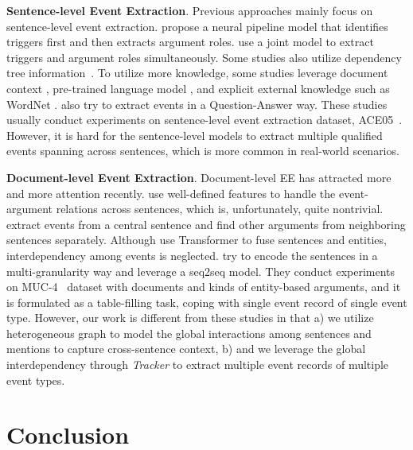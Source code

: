 \documentclass[11pt,a4paper]{article}
\begin{document}
\textbf{Sentence-level Event Extraction}. 
Previous approaches mainly focus on sentence-level event extraction.
\citet{chen-etal-2015-event} propose a neural pipeline model that identifies triggers first and then extracts argument roles.
\citet{nguyen-etal-2016-joint} use a joint model to extract triggers and argument roles simultaneously.
Some studies also utilize dependency tree information~\citep{liu-etal-2018-jointly, yan-etal-2019-event}.
To utilize more knowledge, some studies leverage 
document context \citep{chen-etal-2018-collective, zhao-etal-2018-document}, pre-trained language model \citep{yang-etal-2019-exploring-pre}, and explicit external knowledge \citep{DBLP:conf/aaai/Liu0019, tong-etal-2020-improving} such as WordNet \citep{DBLP:journals/cacm/Miller95}.
\citet{du-cardie-2020-event} also try to extract events in a Question-Answer way.
These studies usually conduct experiments on sentence-level event extraction dataset,  ACE05~\citep{ace05}.
However, it is hard for the sentence-level models to extract multiple qualified events spanning across sentences, which is more common in real-world scenarios.

\textbf{Document-level Event Extraction}.
Document-level EE has attracted more and more attention recently.
\citet{yang-mitchell-2016-joint} use well-defined features to handle the event-argument relations across sentences, which is, unfortunately, quite nontrivial.
\citet{yang-etal-2018-dcfee} extract events from a central sentence and find other arguments from neighboring sentences separately.
Although \citet{zheng-etal-2019-doc2edag} use Transformer to fuse sentences and entities, interdependency among events is neglected.
\citet{du-cardie-2020-document} try to encode the sentences in a multi-granularity way and \citet{DBLP:journals/corr/abs-2008-09249} leverage a seq2seq model.
They conduct experiments on MUC-4~\citep{muc} dataset with  documents and  kinds of entity-based arguments, and it is formulated as a table-filling task, coping with single event record of single event type.
However, our work is different from these studies in that
a) we utilize heterogeneous graph to model the global interactions among sentences and mentions to capture cross-sentence context,
b) and we leverage the global interdependency through \textit{Tracker} to extract multiple event records of multiple event types. \section{Conclusion}
\end{document}
